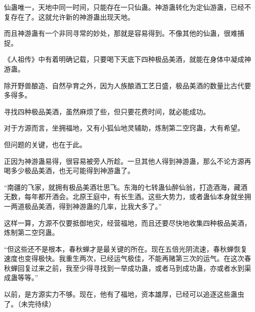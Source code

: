 \begin{this_body}
仙蛊唯一，天地中同一时间，只能存在一只仙蛊。神游蛊转化为定仙游蛊，已经不复存在了。这就允许新的神游蛊出现天地。

而且神游蛊有一个非同寻常的妙处，那就是容易得到。不像其他的仙蛊，很难捕捉。

《人祖传》中有着明确记载，只要喝下天底下四种极品美酒，就能在身体中凝成神游蛊。

除开野兽酿造、自然孕育之外，因为人族酿酒工艺日盛，极品美酒的数量比古代要多得多。

寻找四种极品美酒，虽然麻烦了些，但只要花费时间，就必能成功。

对于方源而言，坐拥福地，又有小狐仙地灵辅助，炼制第二空窍蛊，大有希望。

但问题的关键，也在于此。

正因为神游蛊易得，很容易被旁人所趁。一旦其他人得到神游蛊，那么不论方源再喝多少极品美酒，也无可能得到神游蛊了。

“南疆的飞家，就拥有极品美酒壮思飞。东海的七转蛊仙醉仙翁，打造酒海，藏酒无数，每年都开酒会。北原王庭中，有长生酒。这些大势力，或者蛊仙本身就坐拥一两道极品美酒，得到神游蛊的几率，比我大多了。”

这样一算，方源不仅要抵御地灾，经营福地，而且还要尽快地收集四种极品美酒，炼制第二空窍蛊。

“但这些还不是根本，春秋蝉才是最关键的所在。现在五倍光阴流速，春秋蝉恢复速度也变得极快。我重生两次，已经运气极佳，不能再赌第三次的运气。在这次春秋蝉回复过来之前，我至少得寻找到一举成功蛊，或者马到成功蛊，亦或者水到渠成蛊等等。”

以前，是方源实力不够。现在，他有了福地，资本雄厚，已经可以追逐这些蛊虫了。（未完待续）

\end{this_body}

